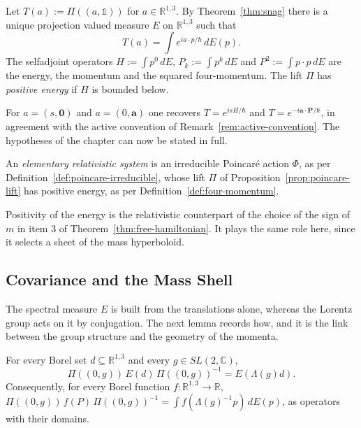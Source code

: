 	\begin{definition}\label{def:four-momentum}
		Let $T(a):=\Pi((a,\mathbb{1}))$ for $a\in\mathbb{R}^{1,3}$. By Theorem~\ref{thm:snag} there is a unique projection valued measure $E$ on $\mathbb{R}^{1,3}$ such that
		\begin{equation*}
			T(a)=\int e^{ia\cdot p/\hbar}\,dE(p).
		\end{equation*}
		The selfadjoint operators $H:=\int p^0\,dE$, $P_k:=\int p^k\,dE$ and $P^2:=\int p\cdot p\,dE$ are the energy, the momentum and the squared four-momentum. The lift $\Pi$ has \emph{positive energy} if $H$ is bounded below.
	\end{definition}
	
	For $a=(s,\mathbf{0})$ and $a=(0,\mathbf{a})$ one recovers $T=e^{isH/\hbar}$ and $T=e^{-i\mathbf{a}\cdot\mathbf{P}/\hbar}$, in agreement with the active convention of Remark~\ref{rem:active-convention}. The hypotheses of the chapter can now be stated in full.
	
	\begin{definition}\label{def:elementary-system}
		An \emph{elementary relativistic system} is an irreducible Poincar\'e action $\Phi$, as per Definition~\ref{def:poincare-irreducible}, whose lift $\Pi$ of Proposition~\ref{prop:poincare-lift} has positive energy, as per Definition~\ref{def:four-momentum}.
	\end{definition}
	
	Positivity of the energy is the relativistic counterpart of the choice of the sign of $m$ in item 3 of Theorem~\ref{thm:free-hamiltonian}. It plays the same role here, since it selects a sheet of the mass hyperboloid.
	
	\subsection{Covariance and the Mass Shell}\label{sec:poincare-spectral}
	
	The spectral measure $E$ is built from the translations alone, whereas the Lorentz group acts on it by conjugation. The next lemma records how, and it is the link between the group structure and the geometry of the momenta.
	
	\begin{lemma}\label{lem:poincare-covariance}
		For every Borel set $d\subseteq\mathbb{R}^{1,3}$ and every $g\in SL(2,\mathbb{C})$,
		\begin{equation*}
			\Pi((0,g))\,E(d)\,\Pi((0,g))^{-1}=E(\Lambda(g)d).
		\end{equation*}
		Consequently, for every Borel function $f:\mathbb{R}^{1,3}\to\mathbb{R}$, $\Pi((0,g))\,f(P)\,\Pi((0,g))^{-1}=\int f(\Lambda(g)^{-1}p)\,dE(p)$, as operators with their domains.
	\end{lemma}
	
